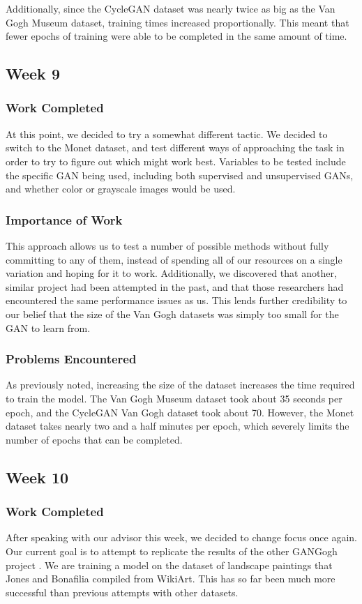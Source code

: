 \documentclass[11pt,letterpaper]{article}
\begin{document}
				Additionally, since the CycleGAN dataset was nearly twice as big as the Van Gogh Museum dataset, training times increased proportionally.
				This meant that fewer epochs of training were able to be completed in the same amount of time.

		\subsection{Week 9}
			\subsubsection{Work Completed}
				At this point, we decided to try a somewhat different tactic.
				We decided to switch to the Monet dataset, and test different ways of approaching the task in order to try to figure out which might work best.
				Variables to be tested include the specific GAN being used, including both supervised and unsupervised GANs, and whether color or grayscale images would be used.
			\subsubsection{Importance of Work}
				This approach allows us to test a number of possible methods without fully committing to any of them, instead of spending all of our resources on a single variation and hoping for it to work.
				Additionally, we discovered that another, similar project had been attempted in the past\cite{otherGanGogh}, and that those researchers had encountered the same performance issues as us.
				This lends further credibility to our belief that the size of the Van Gogh datasets was simply too small for the GAN to learn from.
			\subsubsection{Problems Encountered}
				As previously noted, increasing the size of the dataset increases the time required to train the model.
				The Van Gogh Museum dataset took about 35 seconds per epoch, and the CycleGAN Van Gogh dataset took about 70.
				However, the Monet dataset takes nearly two and a half minutes per epoch, which severely limits the number of epochs that can be completed.

		\subsection{Week 10}
			\subsubsection{Work Completed}
				After speaking with our advisor this week, we decided to change focus once again.
				Our current goal is to attempt to replicate the results of the other GANGogh project \cite{otherGanGogh}.
				We are training a model on the dataset of landscape paintings that Jones and Bonafilia compiled from WikiArt.
				This has so far been much more successful than previous attempts with other datasets.
\end{document}
